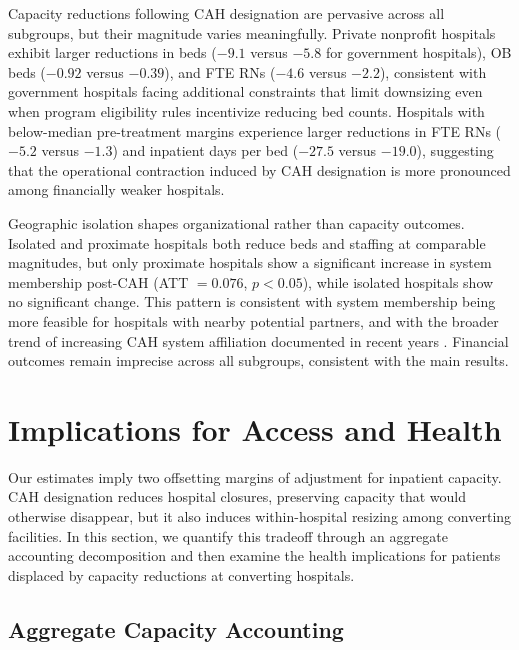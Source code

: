 \documentclass[a4paper, 12pt, twoside]{article}
\begin{document}
Capacity reductions following CAH designation are pervasive across all subgroups, but their magnitude varies meaningfully. Private nonprofit hospitals exhibit larger reductions in beds ($-9.1$ versus $-5.8$ for government hospitals), OB beds ($-0.92$ versus $-0.39$), and FTE RNs ($-4.6$ versus $-2.2$), consistent with government hospitals facing additional constraints that limit downsizing even when program eligibility rules incentivize reducing bed counts. Hospitals with below-median pre-treatment margins experience larger reductions in FTE RNs ($-5.2$ versus $-1.3$) and inpatient days per bed ($-27.5$ versus $-19.0$), suggesting that the operational contraction induced by CAH designation is more pronounced among financially weaker hospitals.

Geographic isolation shapes organizational rather than capacity outcomes. Isolated and proximate hospitals both reduce beds and staffing at comparable magnitudes, but only proximate hospitals show a significant increase in system membership post-CAH (ATT $= 0.076$, $p < 0.05$), while isolated hospitals show no significant change. This pattern is consistent with system membership being more feasible for hospitals with nearby potential partners, and with the broader trend of increasing CAH system affiliation documented in recent years \citep{whaley2024-jama}. Financial outcomes remain imprecise across all subgroups, consistent with the main results.



\section{Implications for Access and Health}
\label{sec:access_health}

Our estimates imply two offsetting margins of adjustment for inpatient capacity. CAH designation reduces hospital closures, preserving capacity that would otherwise disappear, but it also induces within-hospital resizing among converting facilities. In this section, we quantify this tradeoff through an aggregate accounting decomposition and then examine the health implications for patients displaced by capacity reductions at converting hospitals.

\subsection{Aggregate Capacity Accounting}
\label{sec:net_capacity}
\end{document}
